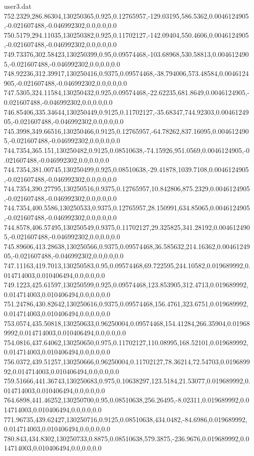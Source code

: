 \begin{filecontents}{user3.dat}
752.2329,286.86304,130250365,0.925,0.12765957,-129.03195,586.5362,0.0046124905,-0.021607488,-0.046992302,0.0,0.0,0.0
750.5179,294.11035,130250382,0.925,0.11702127,-142.09404,550.4606,0.0046124905,-0.021607488,-0.046992302,0.0,0.0,0.0
749.73376,302.58423,130250399,0.95,0.09574468,-103.68968,530.58813,0.0046124905,-0.021607488,-0.046992302,0.0,0.0,0.0
748.92236,312.39917,130250416,0.9375,0.09574468,-38.794006,573.48584,0.0046124905,-0.021607488,-0.046992302,0.0,0.0,0.0
747.5305,324.11584,130250432,0.925,0.09574468,-22.62235,681.8649,0.0046124905,-0.021607488,-0.046992302,0.0,0.0,0.0
746.85406,335.34644,130250449,0.9125,0.11702127,-35.68347,744.92303,0.0046124905,-0.021607488,-0.046992302,0.0,0.0,0.0
745.3998,349.66516,130250466,0.9125,0.12765957,-64.78262,837.16095,0.0046124905,-0.021607488,-0.046992302,0.0,0.0,0.0
744.7354,365.151,130250482,0.9125,0.08510638,-74.15926,951.0569,0.0046124905,-0.021607488,-0.046992302,0.0,0.0,0.0
744.7354,381.00745,130250499,0.925,0.08510638,-29.41878,1039.7108,0.0046124905,-0.021607488,-0.046992302,0.0,0.0,0.0
744.7354,390.27795,130250516,0.9375,0.12765957,10.842806,875.2329,0.0046124905,-0.021607488,-0.046992302,0.0,0.0,0.0
744.7354,400.5586,130250533,0.9375,0.12765957,28.150991,634.85065,0.0046124905,-0.021607488,-0.046992302,0.0,0.0,0.0
744.8578,406.57495,130250549,0.9375,0.11702127,29.325825,341.28192,0.0046124905,-0.021607488,-0.046992302,0.0,0.0,0.0
745.89606,413.28638,130250566,0.9375,0.09574468,36.585632,214.16362,0.0046124905,-0.021607488,-0.046992302,0.0,0.0,0.0
747.11163,419.7013,130250583,0.95,0.09574468,69.722595,244.10582,0.019689992,0.014714003,0.010406494,0.0,0.0,0.0
749.1223,425.61597,130250599,0.925,0.09574468,123.853905,312.4713,0.019689992,0.014714003,0.010406494,0.0,0.0,0.0
751.24786,430.82642,130250616,0.9375,0.09574468,156.4761,323.6751,0.019689992,0.014714003,0.010406494,0.0,0.0,0.0
753.0574,435.50818,130250633,0.96250004,0.09574468,154.41284,266.35904,0.019689992,0.014714003,0.010406494,0.0,0.0,0.0
754.0816,437.64062,130250650,0.975,0.11702127,110.08995,168.52101,0.019689992,0.014714003,0.010406494,0.0,0.0,0.0
756.0372,439.51257,130250666,0.96250004,0.11702127,78.36214,72.54703,0.019689992,0.014714003,0.010406494,0.0,0.0,0.0
759.51666,441.36743,130250683,0.975,0.10638297,123.5184,21.53077,0.019689992,0.014714003,0.010406494,0.0,0.0,0.0
764.6898,441.46252,130250700,0.95,0.08510638,256.26495,-8.02311,0.019689992,0.014714003,0.010406494,0.0,0.0,0.0
771.96735,439.62427,130250716,0.9125,0.08510638,434.0482,-84.6986,0.019689992,0.014714003,0.010406494,0.0,0.0,0.0
780.843,434.8302,130250733,0.8875,0.08510638,579.3875,-236.9676,0.019689992,0.014714003,0.010406494,0.0,0.0,0.0

\end{filecontents}
